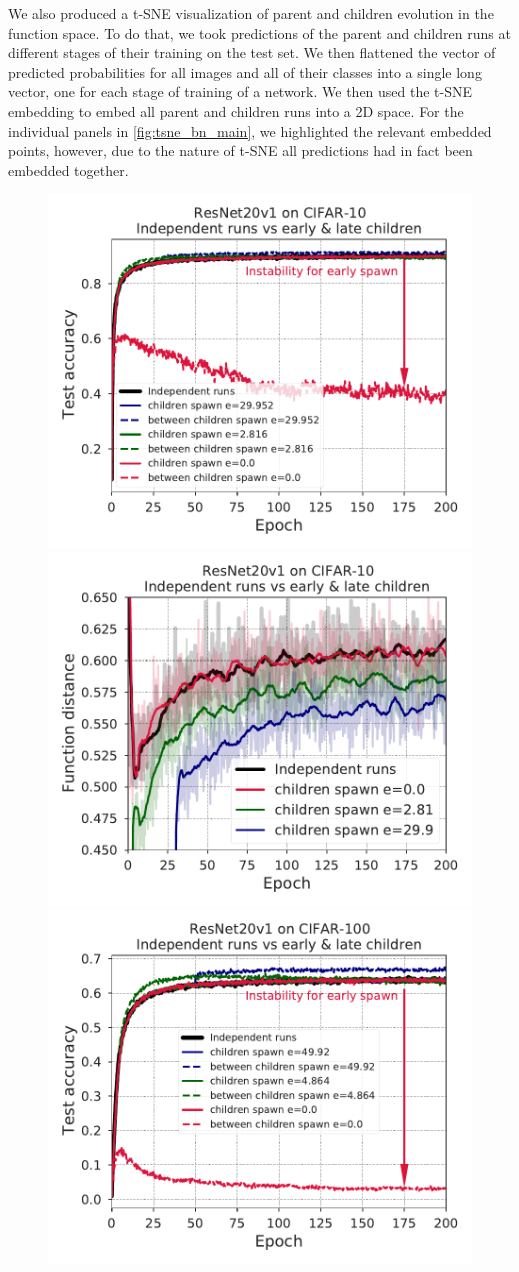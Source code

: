 \documentclass{article}
\begin{document}
We also produced a t-SNE \citep{vanDerMaaten2008} visualization of parent and children evolution in the function space. To do that, we took predictions of the parent and children runs at different stages of their training on the test set. We then flattened the vector of predicted probabilities for all images and all of their classes into a single long vector, one for each stage of training of a network. We then used the t-SNE embedding to embed all parent and children runs into a 2D space. For the individual panels in 
\cref{fig:tsne_bn_main}, we highlighted the relevant embedded points, however, due to the nature of t-SNE all predictions had in fact been embedded together.

%
\begin{figure}[b!]
\centering
\includegraphics[width=0.49\linewidth]{figures/evolution_testaccuracy_vs_epoch_ResNet_CIFAR10_44163502.pdf}
\includegraphics[width=0.49\linewidth]{figures/evolution_fndistance_vs_epoch_ResNet_CIFAR10_13897577.pdf} \\
\includegraphics[width=0.49\linewidth]{figures/evolution_testaccuracy_vs_epoch_ResNet_CIFAR100_78739768.pdf}

\end{figure}
\end{document}
